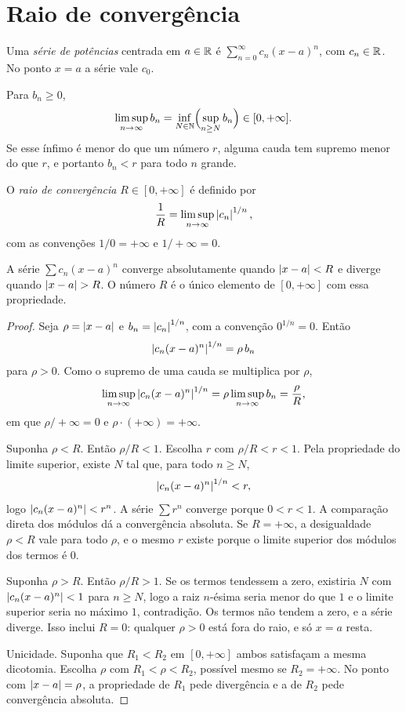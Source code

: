 \documentclass[11pt,a4paper]{article}
\begin{document}
\section{Raio de convergência}

\begin{definicao}
Uma \emph{série de potências} centrada em \(a\in\mathbb{R}\) é \(\sum_{n=0}^\infty c_n(x-a)^n\), com \(c_n\in\mathbb{R}\). No ponto \(x=a\) a série vale \(c_0\).
\end{definicao}

\begin{definicao}
Para \(b_n\ge 0\),
\[
\limsup_{n\to\infty} b_n=\inf_{N\in\mathbb{N}}\Bigl(\sup_{n\ge N} b_n\Bigr)\in[0,+\infty].
\]
Se esse ínfimo é menor do que um número \(r\), alguma cauda tem supremo menor do que \(r\), e portanto \(b_n<r\) para todo \(n\) grande.
\end{definicao}

\begin{definicao}
O \emph{raio de convergência} \(R\in[0,+\infty]\) é definido por
\[
\frac{1}{R}=\limsup_{n\to\infty}\left\lvert c_n \right\rvert^{1/n},
\]
com as convenções \(1/0=+\infty\) e \(1/+\infty=0\).
\end{definicao}

\begin{teorema}
\label{thm:raio}
A série \(\sum c_n(x-a)^n\) converge absolutamente quando \(\left\lvert x-a \right\rvert<R\) e diverge quando \(\left\lvert x-a \right\rvert>R\). O número \(R\) é o único elemento de \([0,+\infty]\) com essa propriedade.
\end{teorema}

\begin{proof}
Seja \(\rho=\left\lvert x-a \right\rvert\) e \(b_n=\left\lvert c_n \right\rvert^{1/n}\), com a convenção \(0^{1/n}=0\). Então
\[
\left\lvert c_n(x-a)^n \right\rvert^{1/n}=\rho\, b_n
\]
para \(\rho>0\). Como o supremo de uma cauda se multiplica por \(\rho\),
\[
\limsup_{n\to\infty}\left\lvert c_n(x-a)^n \right\rvert^{1/n}=\rho\limsup_{n\to\infty} b_n=\frac{\rho}{R},
\]
em que \(\rho/+\infty=0\) e \(\rho\cdot(+\infty)=+\infty\).

Suponha \(\rho<R\). Então \(\rho/R<1\). Escolha \(r\) com \(\rho/R<r<1\). Pela propriedade do limite superior, existe \(N\) tal que, para todo \(n\ge N\),
\[
\left\lvert c_n(x-a)^n \right\rvert^{1/n}<r,
\]
logo \(\left\lvert c_n(x-a)^n \right\rvert<r^n\). A série \(\sum r^n\) converge porque \(0<r<1\). A comparação direta dos módulos dá a convergência absoluta. Se \(R=+\infty\), a desigualdade \(\rho<R\) vale para todo \(\rho\), e o mesmo \(r\) existe porque o limite superior dos módulos dos termos é \(0\).

Suponha \(\rho>R\). Então \(\rho/R>1\). Se os termos tendessem a zero, existiria \(N\) com \(\left\lvert c_n(x-a)^n \right\rvert<1\) para \(n\ge N\), logo a raiz \(n\)-ésima seria menor do que \(1\) e o limite superior seria no máximo \(1\), contradição. Os termos não tendem a zero, e a série diverge. Isso inclui \(R=0\): qualquer \(\rho>0\) está fora do raio, e só \(x=a\) resta.

Unicidade. Suponha que \(R_1<R_2\) em \([0,+\infty]\) ambos satisfaçam a mesma dicotomia. Escolha \(\rho\) com \(R_1<\rho<R_2\), possível mesmo se \(R_2=+\infty\). No ponto com \(\left\lvert x-a \right\rvert=\rho\), a propriedade de \(R_1\) pede divergência e a de \(R_2\) pede convergência absoluta.
\end{proof}
\end{document}
